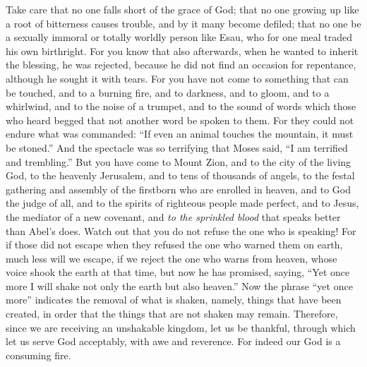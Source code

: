 \begin{biblechapter}
\verse Take care that no one falls short of the grace of God; that no one growing up like a root of bitterness causes trouble, and by it many become defiled;
\verse that no one be a sexually immoral or totally worldly person like Esau, who for one meal traded his own birthright.
\verse For you know that also afterwards, when he wanted to inherit the blessing, he was rejected, because he did not find an occasion for repentance, although he sought it with tears.
\verse For you have not come to something that can be touched, and to a burning fire, and to darkness, and to gloom, and to a whirlwind,
\verse and to the noise of a trumpet, and to the sound of words which those who heard begged that not another word be spoken to them.
\verse For they could not endure what was commanded: “If even an animal touches the mountain, it must be stoned.”
\verse And the spectacle was so terrifying that Moses said, “I am terrified and trembling.”
\verse But you have come to Mount Zion, and to the city of the living God, to the heavenly Jerusalem, and to tens of thousands of angels, to the festal gathering
\verse and assembly of the firstborn who are enrolled in heaven, and to God the judge of all, and to the spirits of righteous people made perfect,
\verse and to Jesus, the mediator of a new covenant, and \textit{to the sprinkled blood} that speaks better than Abel’s does.
\verse Watch out that you do not refuse the one who is speaking! For if those did not escape when they refused the one who warned them on earth, much less will we escape, if we reject the one who warns from heaven,
\verse whose voice shook the earth at that time, but now he has promised, saying, “Yet once more I will shake not only the earth but also heaven.”
\verse Now the phrase “yet once more” indicates the removal of what is shaken, namely, things that have been created, in order that the things that are not shaken may remain.
\verse Therefore, since we are receiving an unshakable kingdom, let us be thankful, through which let us serve God acceptably, with awe and reverence.
\verse For indeed our God is a consuming fire.
\end{biblechapter}


